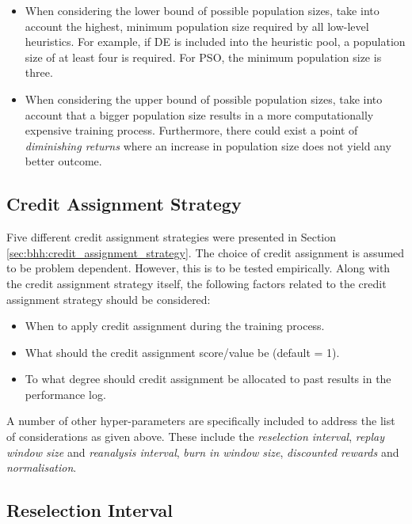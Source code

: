 \begin{itemize}
      \item When considering the lower bound of possible population sizes, take into account the highest, minimum population size required by all low-level heuristics. For example, if \Acs{DE} is included into the heuristic pool, a population size of at least four is required. For \acs{PSO}, the minimum population size is three.

      \item When considering the upper bound of possible population sizes, take into account that a bigger population size results in a more computationally expensive training process. Furthermore, there could exist a point of \textit{diminishing returns} where an increase in population size does not yield any better outcome.
\end{itemize}

\subsection{Credit Assignment Strategy}\label{sec:bhh:hyper_parameters:credit}

Five different credit assignment strategies were presented in Section \ref{sec:bhh:credit_assignment_strategy}. The choice of credit assignment is assumed to be problem dependent. However, this is to be tested empirically. Along with the credit assignment strategy itself, the following factors related to the credit assignment strategy should be considered:

\begin{itemize}
      \item When to apply credit assignment during the training process.
      \item What should the credit assignment score/value be (default = 1).
      \item To what degree should credit assignment be allocated to past results in the performance log.
\end{itemize}

A number of other hyper-parameters are specifically included to address the list of considerations as given above. These include the \textit{reselection interval}, \textit{replay window size} and \textit{reanalysis interval}, \textit{burn in window size}, \textit{discounted rewards} and \textit{normalisation}.

\subsection{Reselection Interval}\label{sec:bhh:hyper_parameters:reselection}

